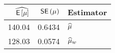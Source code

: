 \begin{table}[ht]
\centering
\begin{tabular}{rrl}
  \hline
$\widehat{\,\mathsf{E}\left[\mu\right]}$ & $\,\mathsf{SE}\left(\mu\right)$ & Estimator \\ 
  \hline
140.04 & 0.6434 & $\widehat{\mu}$ \\ 
  128.03 & 0.0574 & $\widehat{\mu}_w$ \\ 
   \hline
\end{tabular}
\end{table}
